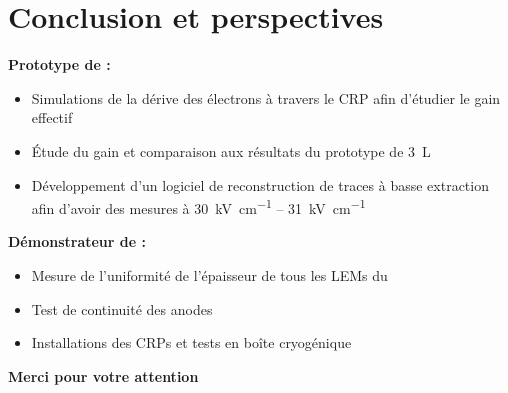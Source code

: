     \section{Conclusion et perspectives}
    {
        \begin{specialframe}
            \hspace*{-1.8cm}\parbox[t]{\textwidth}{
                        \centering \begin{huge}
                        \vspace{3cm}
                        \end{huge}
                        \textbf{Prototype de \TOO{} :}
                        \begin{itemize}
              	           	\item Simulations de la dérive des électrons à travers le CRP afin d'étudier le gain effectif
        	               	\item Étude du gain et comparaison aux résultats du prototype de \SI{3}{\liter}
          	               	\item Développement d'un logiciel de reconstruction de traces à basse extraction afin d'avoir des mesures à \SI{30}{\kilo\volt\per\centi\meter} -- \SI{31}{\kilo\volt\per\centi\meter}
          	           	\end{itemize}
                        \vspace{0.3cm}
                        \textbf{ Démonstrateur de \SSS{} : }
                        \begin{itemize}
                            \item Mesure de l'uniformité de l'épaisseur de tous les LEMs du \SSS{}
                            \item Test de continuité des anodes
                            \item Installations des CRPs et tests en boîte cryogénique
                        \end{itemize}
                    }
        \end{specialframe}
    }
    
    {
        \begin{specialframe}
            \hspace*{-1.8cm}\parbox[t]{\textwidth}{
                \centering \begin{Huge}
                \vspace{1cm}
                \textbf{Merci pour votre attention}
                \end{Huge}
            }
        \end{specialframe}
    }
    
